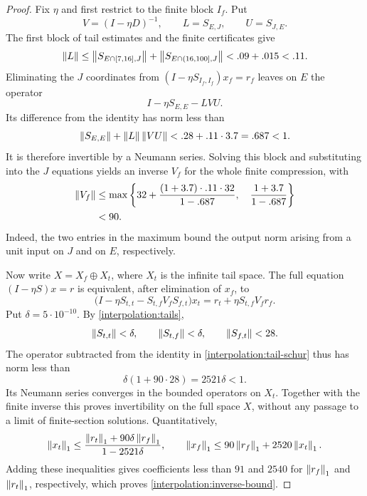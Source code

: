 \begin{proof}
Fix $\eta$ and first restrict to the finite block $I_f$.  Put
\[
 V=(I-\eta D)^{-1},\qquad L=S_{E,J},\qquad U=S_{J,E}.
\]
The first block of tail estimates and the finite certificates give
\[
 \left\lVert L\right\rVert
 \le\left\lVert S_{E\cap[7,16],J}\right\rVert+\left\lVert S_{E\cap(16,100],J}\right\rVert
 <.09+.015<.11.
\]
Eliminating the $J$ coordinates from
$(I-\eta S_{I_f,I_f})x_f=r_f$ leaves on $E$ the operator
\[
 I-\eta S_{E,E}-LVU.
\]
Its difference from the identity has norm less than
\[
 \left\lVert S_{E,E}\right\rVert+\left\lVert L\right\rVert\left\lVert VU\right\rVert
 <.28+.11\cdot3.7=.687<1.
\]
It is therefore invertible by a Neumann series.  Solving this block and
substituting into the $J$ equations yields an inverse $V_f$ for the whole
finite compression, with
\begin{equation}\label{interpolation:finite-inverse-bound}
 \begin{split}
 \left\lVert V_f\right\rVert
 &\le\max\left\{
 32+\frac{(1+3.7)\cdot.11\cdot32}{1-.687},\quad
 \frac{1+3.7}{1-.687}\right\}\\
 &<90.
 \end{split}
\end{equation}
Indeed, the two entries in the maximum bound the output norm arising
from a unit input on $J$ and on $E$, respectively.

Now write $X=X_f\oplus X_t$, where $X_t$ is the infinite tail space.
The full equation $(I-\eta S)x=r$ is equivalent, after elimination of
$x_f$, to
\begin{equation}\label{interpolation:tail-schur}
 \bigl(I-\eta S_{t,t}-S_{t,f}V_fS_{f,t}\bigr)x_t
 =r_t+\eta S_{t,f}V_fr_f.
\end{equation}
Put $\delta=5\cdot10^{-10}$.  By
\eqref{interpolation:tails},
\[
 \left\lVert S_{t,t}\right\rVert<\delta,\qquad
 \left\lVert S_{t,f}\right\rVert<\delta,\qquad
 \left\lVert S_{f,t}\right\rVert<28.
\]
The operator subtracted from the identity in
\eqref{interpolation:tail-schur} thus has norm less than
\[
 \delta(1+90\cdot28)=2521\delta<1.
\]
Its Neumann series converges in the bounded operators on $X_t$.
Together with the finite inverse this proves invertibility on the full
space $X$, without any passage to a limit of finite-section solutions.
Quantitatively,
\[
 \left\lVert x_t\right\rVert_1
 \le\frac{\left\lVert r_t\right\rVert_1+90\delta\left\lVert r_f\right\rVert_1}{1-2521\delta},
 \qquad
 \left\lVert x_f\right\rVert_1\le90\left\lVert r_f\right\rVert_1+2520\left\lVert x_t\right\rVert_1.
\]
Adding these inequalities gives coefficients less than $91$ and $2540$
for $\left\lVert r_f\right\rVert_1$ and $\left\lVert r_t\right\rVert_1$, respectively, which proves
\eqref{interpolation:inverse-bound}.
\end{proof}

